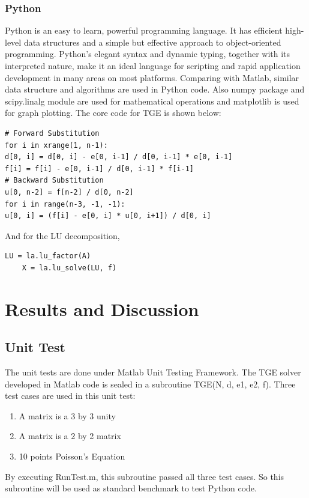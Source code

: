 \documentclass{article}
\begin{document}
\subsubsection{Python}
Python is an easy to learn, powerful programming language. It has efficient high-level data structures and a simple but effective approach to object-oriented programming. Python’s elegant syntax and dynamic typing, together with its interpreted nature, make it an ideal language for scripting and rapid application development in many areas on most platforms.
Comparing with Matlab, similar data structure and algorithms are used in Python code. Also numpy package and scipy.linalg module are used for mathematical operations and matplotlib is used for graph plotting. The core code for TGE is shown below:
  \begin{lstlisting}[frame=single]  
# Forward Substitution
for i in xrange(1, n-1):
d[0, i] = d[0, i] - e[0, i-1] / d[0, i-1] * e[0, i-1]
f[i] = f[i] - e[0, i-1] / d[0, i-1] * f[i-1]
# Backward Substitution
u[0, n-2] = f[n-2] / d[0, n-2]
for i in range(n-3, -1, -1):
u[0, i] = (f[i] - e[0, i] * u[0, i+1]) / d[0, i]
  \end{lstlisting}  
  And for the LU decomposition, 
    \begin{lstlisting}[frame=single]  
    LU = la.lu_factor(A)
    X = la.lu_solve(LU, f)
    \end{lstlisting} 

\section{Results and Discussion}
\subsection{Unit Test}
The unit tests are done under Matlab Unit Testing Framework. The TGE solver developed in Matlab code is sealed in a subroutine TGE(N, d, e1, e2, f). Three test cases are used in this unit test: \\
\begin{enumerate}
	\item A matrix is a 3 by 3 unity
	\item A matrix is a 2 by 2 matrix
	\item 10 points Poisson's Equation
\end{enumerate}
By executing RunTest.m, this subroutine passed all three test cases. So this subroutine will be used as standard benchmark to test Python code.
\end{document}
